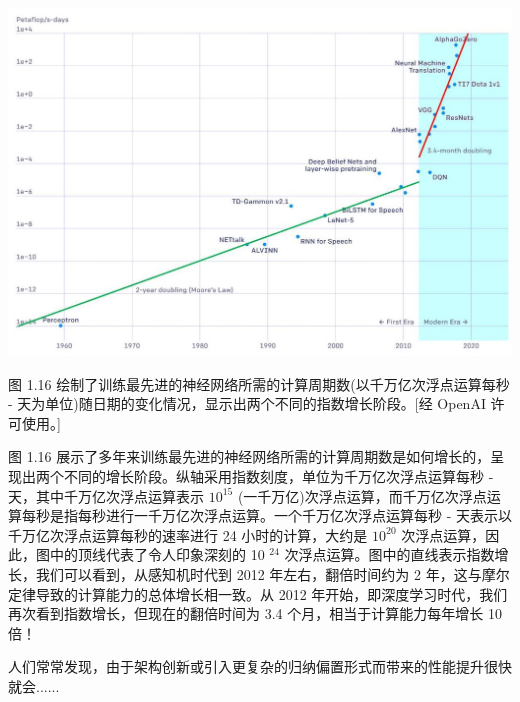 \documentclass[10pt]{report}
\begin{document}
\begin{center}
\includegraphics[max width=1.0\textwidth]{images/0194e279-9b28-703a-88f4-c3ac21e2010d_40_255_347_1276_882_0.jpg}
\end{center}
\hspace*{3em} 

图 1.16 绘制了训练最先进的神经网络所需的计算周期数(以千万亿次浮点运算每秒 - 天为单位)随日期的变化情况，显示出两个不同的指数增长阶段。[经 OpenAI 许可使用。]

图 1.16 展示了多年来训练最先进的神经网络所需的计算周期数是如何增长的，呈现出两个不同的增长阶段。纵轴采用指数刻度，单位为千万亿次浮点运算每秒 - 天，其中千万亿次浮点运算表示 \({10}^{15}\) (一千万亿)次浮点运算，而千万亿次浮点运算每秒是指每秒进行一千万亿次浮点运算。一个千万亿次浮点运算每秒 - 天表示以千万亿次浮点运算每秒的速率进行 24 小时的计算，大约是 \({10}^{20}\) 次浮点运算，因此，图中的顶线代表了令人印象深刻的 10 \({}^{24}\) 次浮点运算。图中的直线表示指数增长，我们可以看到，从感知机时代到 2012 年左右，翻倍时间约为 2 年，这与摩尔定律导致的计算能力的总体增长相一致。从 2012 年开始，即深度学习时代，我们再次看到指数增长，但现在的翻倍时间为 3.4 个月，相当于计算能力每年增长 10 倍！

人们常常发现，由于架构创新或引入更复杂的归纳偏置形式而带来的性能提升很快就会......
\end{document}
